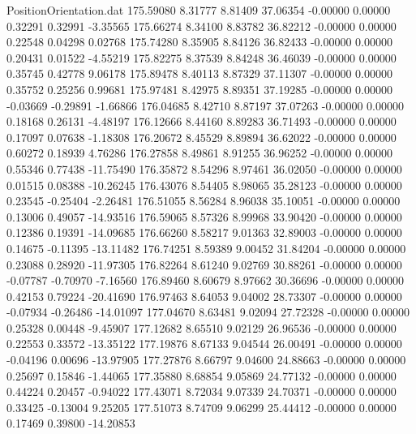 \begin{filecontents}{PositionOrientation.dat}
 175.59080    8.31777    8.81409    37.06354   -0.00000    0.00000    0.32291    0.32991   -3.35565
 175.66274    8.34100    8.83782    36.82212   -0.00000    0.00000    0.22548    0.04298    0.02768
 175.74280    8.35905    8.84126    36.82433   -0.00000    0.00000    0.20431    0.01522   -4.55219
 175.82275    8.37539    8.84248    36.46039   -0.00000    0.00000    0.35745    0.42778    9.06178
 175.89478    8.40113    8.87329    37.11307   -0.00000    0.00000    0.35752    0.25256    0.99681
 175.97481    8.42975    8.89351    37.19285   -0.00000    0.00000   -0.03669   -0.29891   -1.66866
 176.04685    8.42710    8.87197    37.07263   -0.00000    0.00000    0.18168    0.26131   -4.48197
 176.12666    8.44160    8.89283    36.71493   -0.00000    0.00000    0.17097    0.07638   -1.18308
 176.20672    8.45529    8.89894    36.62022   -0.00000    0.00000    0.60272    0.18939    4.76286
 176.27858    8.49861    8.91255    36.96252   -0.00000    0.00000    0.55346    0.77438  -11.75490
 176.35872    8.54296    8.97461    36.02050   -0.00000    0.00000    0.01515    0.08388  -10.26245
 176.43076    8.54405    8.98065    35.28123   -0.00000    0.00000    0.23545   -0.25404   -2.26481
 176.51055    8.56284    8.96038    35.10051   -0.00000    0.00000    0.13006    0.49057  -14.93516
 176.59065    8.57326    8.99968    33.90420   -0.00000    0.00000    0.12386    0.19391  -14.09685
 176.66260    8.58217    9.01363    32.89003   -0.00000    0.00000    0.14675   -0.11395  -13.11482
 176.74251    8.59389    9.00452    31.84204   -0.00000    0.00000    0.23088    0.28920  -11.97305
 176.82264    8.61240    9.02769    30.88261   -0.00000    0.00000   -0.07787   -0.70970   -7.16560
 176.89460    8.60679    8.97662    30.36696   -0.00000    0.00000    0.42153    0.79224  -20.41690
 176.97463    8.64053    9.04002    28.73307   -0.00000    0.00000   -0.07934   -0.26486  -14.01097
 177.04670    8.63481    9.02094    27.72328   -0.00000    0.00000    0.25328    0.00448   -9.45907
 177.12682    8.65510    9.02129    26.96536   -0.00000    0.00000    0.22553    0.33572  -13.35122
 177.19876    8.67133    9.04544    26.00491   -0.00000    0.00000   -0.04196    0.00696  -13.97905
 177.27876    8.66797    9.04600    24.88663   -0.00000    0.00000    0.25697    0.15846   -1.44065
 177.35880    8.68854    9.05869    24.77132   -0.00000    0.00000    0.44224    0.20457   -0.94022
 177.43071    8.72034    9.07339    24.70371   -0.00000    0.00000    0.33425   -0.13004    9.25205
 177.51073    8.74709    9.06299    25.44412   -0.00000    0.00000    0.17469    0.39800  -14.20853

\end{filecontents}
